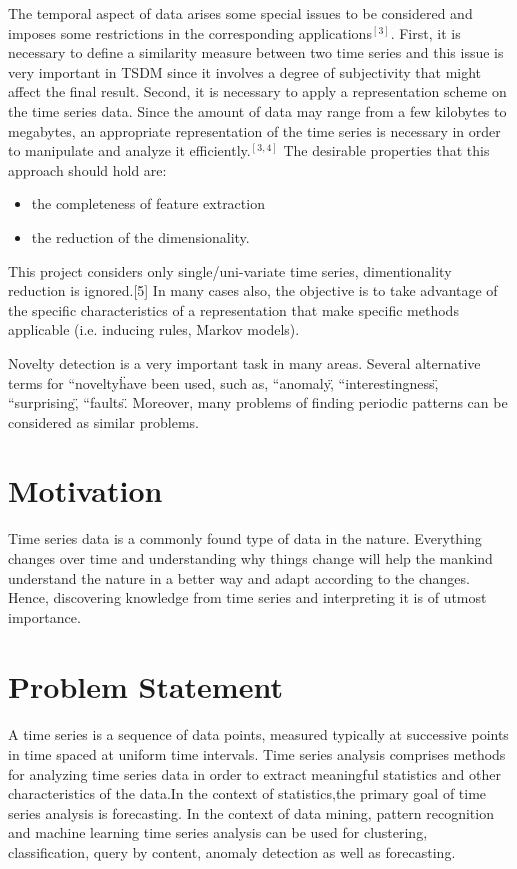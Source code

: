 \documentclass[12pt,a4paper]{report}
\begin{document}
  The temporal aspect of data arises some special issues to be considered and imposes some restrictions in the corresponding applications$^{[3]}$. First, it is necessary to define a similarity measure between two time series and this issue is very important in TSDM since it involves a degree of subjectivity that might affect the final result. Second, it is necessary to apply a representation scheme on the time series data. Since the amount of data may range from a few kilobytes to megabytes, an appropriate representation of the time series is necessary in order to manipulate and analyze it efficiently.$^{[3,4]}$ The desirable properties that this approach should hold are: 
  \begin{itemize}
  \item the completeness of feature extraction 
  \item the reduction of the dimensionality. 
  \end{itemize}

This project  considers only single/uni-variate time series, dimentionality reduction is ignored.[5]
In many cases also, the objective is to take advantage of the specific characteristics of a representation that make specific methods applicable (i.e. inducing rules, Markov models). 

Novelty detection is a very important task in many areas. Several alternative terms for ``novelty\" have been used, such as, ``anomaly\", ``interestingness\", ``surprising\", ``faults\". Moreover, many problems of finding periodic patterns can be considered as similar problems.

\section{Motivation}
Time series data is a commonly found type of data in the nature. Everything changes over time and understanding why things change will help the mankind understand the nature in a better way and adapt according to the changes. Hence, discovering knowledge from time series and interpreting it is of utmost importance.

\section{Problem Statement}
\paragraph{} A time series is a sequence of data points, measured typically at successive points in time spaced at uniform time intervals. Time series analysis comprises methods for analyzing time series data in order to extract meaningful statistics and other characteristics of the data.In the context of statistics,the primary goal of time series analysis is forecasting. In the context of data mining, pattern recognition and machine learning time series analysis can be used for clustering, classification, query by content, anomaly detection as well as forecasting.
\end{document}
